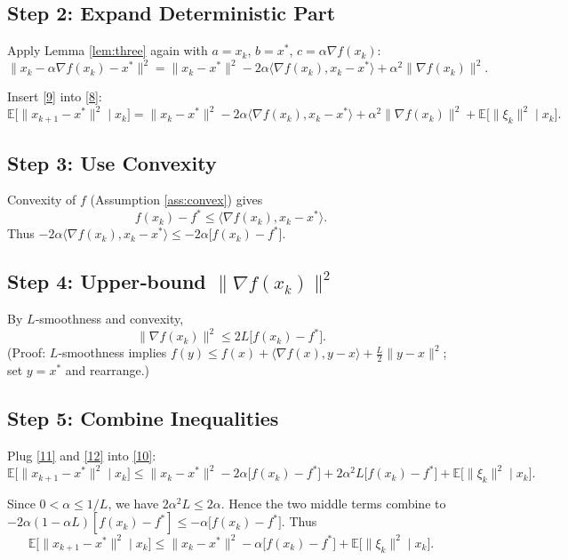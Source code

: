 \documentclass{article}
\newcommand{\E}{\mathbb{E}}
\begin{document}
\subsection*{Step 2: Expand Deterministic Part}
Apply Lemma \ref{lem:three} again with $a=x_{k}$, $b=x^{*}$, $c=\alpha\nabla f(x_{k})$:
\[
\|x_{k}-\alpha\nabla f(x_{k})-x^{*}\|^{2}
= \|x_{k}-x^{*}\|^{2}
   -2\alpha\langle\nabla f(x_{k}),x_{k}-x^{*}\rangle
   +\alpha^{2}\|\nabla f(x_{k})\|^{2}.                     \tag{9}
\]

Insert \eqref{9} into \eqref{8}:
\[
\E\!\bigl[\|x_{k+1}-x^{*}\|^{2}\mid x_{k}\bigr]
= \|x_{k}-x^{*}\|^{2}
   -2\alpha\langle\nabla f(x_{k}),x_{k}-x^{*}\rangle
   +\alpha^{2}\|\nabla f(x_{k})\|^{2}
   +\E\!\bigl[\|\xi_{k}\|^{2}\mid x_{k}\bigr].            \tag{10}
\]

\subsection*{Step 3: Use Convexity}
Convexity of $f$ (Assumption \ref{ass:convex}) gives
\[
f(x_{k})-f^{*}\le \langle\nabla f(x_{k}),x_{k}-x^{*}\rangle. \tag{11}
\]
Thus $-2\alpha\langle\nabla f(x_{k}),x_{k}-x^{*}\rangle\le -2\alpha\bigl[f(x_{k})-f^{*}\bigr]$.

\subsection*{Step 4: Upper‑bound $\|\nabla f(x_{k})\|^{2}$}
By $L$‑smoothness and convexity,
\[
\|\nabla f(x_{k})\|^{2}\le 2L\bigl[f(x_{k})-f^{*}\bigr]. \tag{12}
\]
(Proof: $L$‑smoothness implies $f(y)\le f(x)+\langle\nabla f(x),y-x\rangle+\tfrac{L}{2}\|y-x\|^{2}$; set $y=x^{*}$ and rearrange.)

\subsection*{Step 5: Combine Inequalities}
Plug \eqref{11} and \eqref{12} into \eqref{10}:
\[
\E\!\bigl[\|x_{k+1}-x^{*}\|^{2}\mid x_{k}\bigr]
\le \|x_{k}-x^{*}\|^{2}
   -2\alpha\bigl[f(x_{k})-f^{*}\bigr]
   +2\alpha^{2}L\bigl[f(x_{k})-f^{*}\bigr]
   +\E\!\bigl[\|\xi_{k}\|^{2}\mid x_{k}\bigr].          \tag{13}
\]

Since $0<\alpha\le 1/L$, we have $2\alpha^{2}L\le 2\alpha$. Hence the two middle terms combine to $-2\alpha(1-\alpha L)[f(x_{k})-f^{*}]\le -\alpha\bigl[f(x_{k})-f^{*}\bigr]$.
Thus
\[
\E\!\bigl[\|x_{k+1}-x^{*}\|^{2}\mid x_{k}\bigr]
\le \|x_{k}-x^{*}\|^{2}
   -\alpha\bigl[f(x_{k})-f^{*}\bigr]
   +\E\!\bigl[\|\xi_{k}\|^{2}\mid x_{k}\bigr].          \tag{14}
\]
\end{document}
